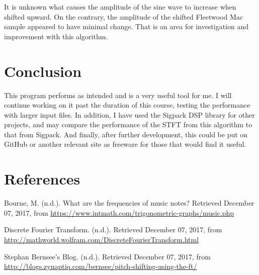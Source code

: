 \documentclass{article}
\begin{document}
It is unknown what causes the amplitude of the sine wave to increase when shifted upward. On the contrary, the amplitude of the shifted Fleetwood Mac sample appeared to have minimal change. That is an area for investigation and improvement with this algorithm.

\section{Conclusion}
This program performs as intended and is a very useful tool for me. I will continue working on it past the duration of this course, testing the performance with larger input files. In addition, I have used the Sigpack DSP library for other projects, and may compare the performance of the STFT from this algorithm to that from Sigpack. And finally, after further development, this could be put on GitHub or another relevant site as freeware for those that would find it useful.


\pagebreak
\section{References}
Bourne, M. (n.d.). What are the frequencies of music notes? Retrieved December 07, 2017, from \url{https://www.intmath.com/trigonometric-graphs/music.php}

Discrete Fourier Transform. (n.d.). Retrieved December 07, 2017, from \newline \url{http://mathworld.wolfram.com/DiscreteFourierTransform.html}

Stephan Bernsee's Blog. (n.d.). Retrieved December 07, 2017, from \newline	\url{http://blogs.zynaptiq.com/bernsee/pitch-shifting-using-the-ft/}
\end{document}
